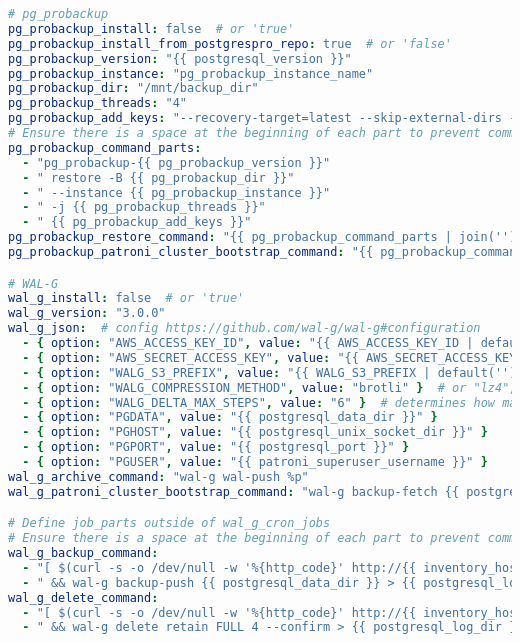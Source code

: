 \begin{flushleft}
\begin{lstlisting}[language=yaml, caption=Testsystem - Anhang - Maintenance - main.yml,captionpos=b,label={lst:testsystem-maintenance-main.yml},breaklines=true]
# pg_probackup
pg_probackup_install: false  # or 'true'
pg_probackup_install_from_postgrespro_repo: true  # or 'false'
pg_probackup_version: "{{ postgresql_version }}"
pg_probackup_instance: "pg_probackup_instance_name"
pg_probackup_dir: "/mnt/backup_dir"
pg_probackup_threads: "4"
pg_probackup_add_keys: "--recovery-target=latest --skip-external-dirs --no-validate"
# Ensure there is a space at the beginning of each part to prevent commands from concatenating.
pg_probackup_command_parts:
  - "pg_probackup-{{ pg_probackup_version }}"
  - " restore -B {{ pg_probackup_dir }}"
  - " --instance {{ pg_probackup_instance }}"
  - " -j {{ pg_probackup_threads }}"
  - " {{ pg_probackup_add_keys }}"
pg_probackup_restore_command: "{{ pg_probackup_command_parts | join('') }}"
pg_probackup_patroni_cluster_bootstrap_command: "{{ pg_probackup_command_parts | join('') }}"

# WAL-G
wal_g_install: false  # or 'true'
wal_g_version: "3.0.0"
wal_g_json:  # config https://github.com/wal-g/wal-g#configuration
  - { option: "AWS_ACCESS_KEY_ID", value: "{{ AWS_ACCESS_KEY_ID | default('') }}" }  # define values or pass via --extra-vars
  - { option: "AWS_SECRET_ACCESS_KEY", value: "{{ AWS_SECRET_ACCESS_KEY | default('') }}" }  # define values or pass via --extra-vars
  - { option: "WALG_S3_PREFIX", value: "{{ WALG_S3_PREFIX | default('') }}" } # define values or pass via --extra-vars
  - { option: "WALG_COMPRESSION_METHOD", value: "brotli" }  # or "lz4", "lzma", "zstd"
  - { option: "WALG_DELTA_MAX_STEPS", value: "6" }  # determines how many delta backups can be between full backups
  - { option: "PGDATA", value: "{{ postgresql_data_dir }}" }
  - { option: "PGHOST", value: "{{ postgresql_unix_socket_dir }}" }
  - { option: "PGPORT", value: "{{ postgresql_port }}" }
  - { option: "PGUSER", value: "{{ patroni_superuser_username }}" }
wal_g_archive_command: "wal-g wal-push %p"
wal_g_patroni_cluster_bootstrap_command: "wal-g backup-fetch {{ postgresql_data_dir }} LATEST"

# Define job_parts outside of wal_g_cron_jobs
# Ensure there is a space at the beginning of each part to prevent commands from concatenating.
wal_g_backup_command:
  - "[ $(curl -s -o /dev/null -w '%{http_code}' http://{{ inventory_hostname }}:{{ patroni_restapi_port }}) = '200' ]"
  - " && wal-g backup-push {{ postgresql_data_dir }} > {{ postgresql_log_dir }}/walg_backup.log 2>&1"
wal_g_delete_command:
  - "[ $(curl -s -o /dev/null -w '%{http_code}' http://{{ inventory_hostname }}:{{ patroni_restapi_port }}) = '200' ]"
  - " && wal-g delete retain FULL 4 --confirm > {{ postgresql_log_dir }}/walg_delete.log 2>&1"


\end{lstlisting}
\end{flushleft}
